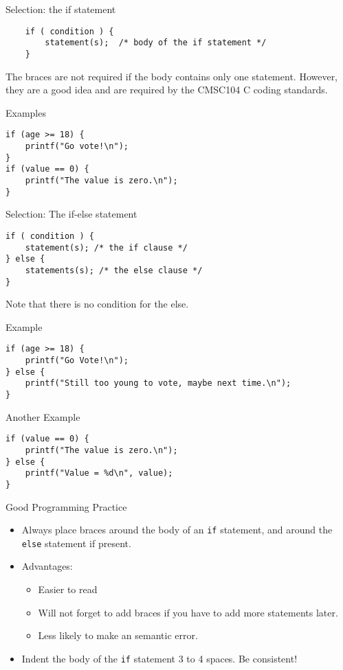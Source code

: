 \documentclass[graphics]{beamer}
\begin{document}
\begin{frame}[fragile]{Selection: the if statement}
\begin{verbatim}
    if ( condition ) {
        statement(s);  /* body of the if statement */
    }
\end{verbatim}
    The braces are not required if the body contains only one statement. However, they are a good idea and are required by the CMSC104 C coding standards.
\end{frame}

\begin{frame}[fragile]{Examples}
\begin{verbatim}
if (age >= 18) {
    printf("Go vote!\n");
}
if (value == 0) {
    printf("The value is zero.\n");
}
\end{verbatim}
\end{frame}

\begin{frame}[fragile]{Selection: The if-else statement}
\begin{verbatim}
if ( condition ) {
    statement(s); /* the if clause */
} else {
    statements(s); /* the else clause */
}
\end{verbatim}
Note that there is no condition for the else.
\end{frame}

\begin{frame}[fragile]{Example}
\begin{verbatim}
if (age >= 18) {
    printf("Go Vote!\n");
} else {
    printf("Still too young to vote, maybe next time.\n");
}
\end{verbatim}
\end{frame}

\begin{frame}[fragile]{Another Example}
\begin{verbatim}
if (value == 0) {
    printf("The value is zero.\n");
} else {
    printf("Value = %d\n", value);
}
\end{verbatim}
\end{frame}

\begin{frame}{Good Programming Practice}
    \begin{itemize}
        \item Always place braces around the body of an \texttt{if} statement, and around the \texttt{else} statement if present.
        \item Advantages:
        \begin{itemize}
            \item Easier to read
            \item Will not forget to add braces if you have to add more statements later.
            \item Less likely to make an semantic error.
        \end{itemize}
        \item Indent the body of the \texttt{if} statement 3 to 4 spaces. Be consistent!
    \end{itemize}
\end{frame}
\end{document}
